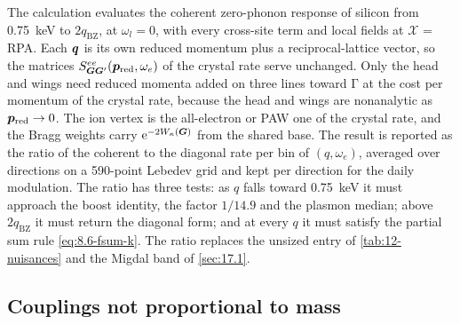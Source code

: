 The calculation evaluates the coherent zero-phonon response of silicon from \SI{0.75}{keV} to $2q_{\mathrm{BZ}}$, at $\omega_l = 0$, with every cross-site term and local fields at $\mathcal{X}$ = RPA. Each $\bm{q}$ is its own reduced momentum plus a reciprocal-lattice vector, so the matrices $S^{ee}_{\bm{G}\bm{G}'}(\bm{p}_{\mathrm{red}},\omega_e)$ of the crystal rate serve unchanged. Only the head and wings need reduced momenta added on three lines toward $\mathrm{\Gamma}$ at the cost per momentum of the crystal rate, because the head and wings are nonanalytic as $\bm{p}_{\mathrm{red}}\to0$. The ion vertex is the all-electron or PAW one of the crystal rate, and the Bragg weights carry $\mathrm{e}^{-2W_\kappa(\bm{G})}$ from the shared base. The result is reported as the ratio of the coherent to the diagonal rate per bin of $(q,\omega_e)$, averaged over directions on a 590-point Lebedev grid and kept per direction for the daily modulation. The ratio has three tests: as $q$ falls toward \SI{0.75}{keV} it must approach the boost identity, the factor $1/14.9$ and the plasmon median; above $2q_{\mathrm{BZ}}$ it must return the diagonal form; and at every $q$ it must satisfy the partial sum rule \cref{eq:8.6-fsum-k}. The ratio replaces the unsized entry of \cref{tab:12-nuisances} and the Migdal band of \cref{sec:17.1}.

\subsection{Couplings not proportional to mass}

